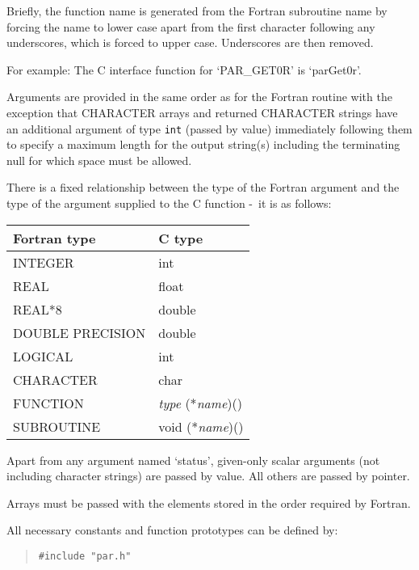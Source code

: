 \documentclass[twoside,11pt]{article}
\newcommand{\dash}{--}
\renewcommand{\dash}{-}
\begin{document}
Briefly, the function name is generated from the Fortran subroutine name by
forcing the name to lower case apart from the first character following any
underscores, which is forced to upper case. Underscores are then removed.

For example: The C interface function for `PAR\_GET0R' is `parGet0r'.

Arguments are provided in the same order as for the Fortran routine with the
exception that CHARACTER arrays and returned CHARACTER strings 
have an additional argument of type \texttt{int} (passed by value) immediately 
following them to specify a maximum length for the output string(s) including 
the terminating null for which space must be allowed. 

There is a fixed relationship between the type of the Fortran 
argument and the type of the argument supplied to the C function \dash\ it is 
as follows:
\begin{center}
\begin{tabular}{|l|l|}
\hline
Fortran type & C type \\
\hline
INTEGER & int \\
REAL & float \\
REAL*8 & double \\
DOUBLE PRECISION & double \\
LOGICAL & int \\
CHARACTER & char \\
FUNCTION & \textit{type} (*\textit{name})() \\
SUBROUTINE & void (*\textit{name})() \\
\hline
\end{tabular}
\end{center}

Apart from any argument named `status', given-only scalar arguments (not
including character strings) are passed by value. 
All others are passed by pointer.

Arrays must be passed with the elements stored in the order required by Fortran.

All necessary constants and function prototypes can be defined by:
\begin{quote} \begin{verbatim}
#include "par.h"
\end{verbatim} \end{quote}
\end{document}
